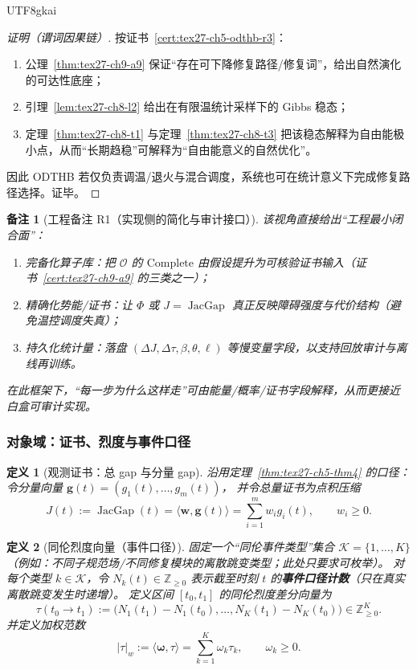 \documentclass[12pt]{article}
\newtheorem{definition}{定义}[section]
\newtheorem{remark}{备注}[section]
\newcommand{\ZZ}{\mathbb{Z}}
\newcommand{\JacGap}{\operatorname{JacGap}}
\begin{document}
\begin{CJK*}{UTF8}{gkai}
\begin{proof}[证明（谓词因果链）]
按证书~\ref{cert:tex27-ch5-odthb-r3}：
\begin{enumerate}
  \item 公理~\ref{thm:tex27-ch9-a9} 保证“存在可下降修复路径/修复词”，给出自然演化的可达性底座；
  \item 引理~\ref{lem:tex27-ch8-l2} 给出在有限温统计采样下的 Gibbs 稳态；
  \item 定理~\ref{thm:tex27-ch8-t1} 与定理~\ref{thm:tex27-ch8-t3} 把该稳态解释为自由能极小点，从而“长期趋稳”可解释为“自由能意义的自然优化”。
\end{enumerate}
因此 ODTHB 若仅负责调温/退火与混合调度，系统也可在统计意义下完成修复路径选择。证毕。
\end{proof}

\begin{remark}[工程备注 R1（实现侧的简化与审计接口）]
该视角直接给出“工程最小闭合面”：
\begin{enumerate}
  \item 完备化算子库：把 $\mathcal{O}$ 的 $\mathrm{Complete}$ 由假设提升为可核验证书输入（证书~\ref{cert:tex27-ch9-a9} 的三类之一）；
  \item 精确化势能/证书：让 $\Phi$ 或 $J=\JacGap$ 真正反映障碍强度与代价结构（避免温控调度失真）；
  \item 持久化统计量：落盘 $(\Delta J,\Delta\tau,\beta,\theta,\ell)$ 等慢变量字段，以支持回放审计与离线再训练。
\end{enumerate}
在此框架下，“每一步为什么这样走”可由能量/概率/证书字段解释，从而更接近白盒可审计实现。
\end{remark}

\subsubsection{对象域：证书、烈度与事件口径}
\label{subsubsec:tex27-ch5-odthb-objects}

\begin{definition}[观测证书：总 gap 与分量 gap]
\label{def:tex27-ch5-odthb-j}
沿用定理~\ref{thm:tex27-ch5-thm4} 的口径：令分量向量 $\mathbf{g}(t)=(g_1(t),\dots,g_m(t))$，
并令总量证书为点积压缩
\[
  J(t):=\JacGap(t)=\langle \mathbf{w},\mathbf{g}(t)\rangle=\sum_{i=1}^m w_i g_i(t),\qquad w_i\ge 0.
\]
\end{definition}

\begin{definition}[同伦烈度向量（事件口径）]
\label{def:tex27-ch5-odthb-tau}
固定一个“同伦事件类型”集合 $\mathcal{K}=\{1,\dots,K\}$（例如：不同子规范场/不同修复模块的离散跳变类型；此处只要求可枚举）。
对每个类型 $k\in\mathcal{K}$，令 $N_k(t)\in\ZZ_{\ge 0}$ 表示截至时刻 $t$ 的\textbf{事件口径计数}（只在真实离散跳变发生时递增）。
定义区间 $[t_0,t_1]$ 的同伦烈度差分向量为
\[
  \tau(t_0\to t_1):=\bigl(N_1(t_1)-N_1(t_0),\dots,N_K(t_1)-N_K(t_0)\bigr)\in\ZZ_{\ge 0}^{K}.
\]
并定义加权范数
\[
  |\tau|_w:=\langle \boldsymbol{\omega},\tau\rangle=\sum_{k=1}^K \omega_k \tau_k,\qquad \omega_k\ge 0.
\]
\end{definition}


\end{CJK*}
\end{document}
